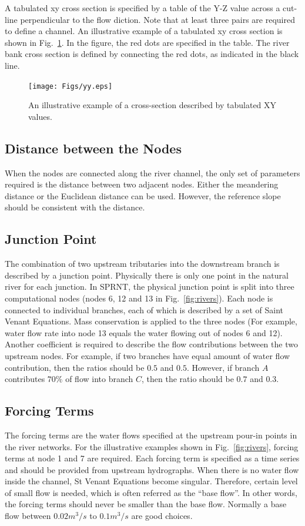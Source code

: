 \documentclass[10pt, letterpaper]{article}
\begin{document}
A tabulated xy cross section is specified by a table of the Y-Z value across a cut-line
perpendicular to the flow diction. Note that at least three pairs are required to define a
channel. An illustrative example of a tabulated xy cross section is shown in
Fig.~\ref{fig:yz}. In the figure, the red dots are specified in the table. The river bank
cross section is defined by connecting the red dots, as indicated in the black line.
\vspace{0.3in}
\begin{figure}[hb]
\centerline{
\texttt{[image: Figs/yy.eps]}}
\caption{An illustrative example of a cross-section described by tabulated XY values.}
\label{fig:yz}
\end{figure}

\subsection{Distance between the Nodes}
\label{subsec:distance}
When the nodes are connected along the river channel, the only set of parameters required
is the distance between two adjacent nodes. Either the meandering distance or the
Euclidean distance can be used. However, the reference slope should be consistent with the
distance.

\subsection{Junction Point}
\label{subsec:junction_pt}
The combination of two upstream tributaries into the downstream branch is described by a
junction point. Physically there is only one point in the natural river for each
junction. In SPRNT, the physical junction point is split into three computational nodes
(nodes 6, 12 and 13 in Fig.~\ref{fig:rivers}). Each node is connected to individual
branches, each of which is described by a set of Saint Venant Equations.  Mass
conservation is applied to the three nodes (For example, water flow rate into node 13
equals the water flowing out of nodes 6 and 12). Another coefficient is required to
describe the flow contributions between the two upstream nodes. For example, if two
branches have equal amount of water flow contribution, then the ratios should be $0.5$ and
$0.5$. However, if branch $A$ contributes $70\%$ of flow into branch $C$, then the ratio
should be $0.7$ and $0.3$. 

\subsection{Forcing Terms}
\label{subsec:forcing}
The forcing terms are the water flows specified at the upstream pour-in points in the river
networks. For the illustrative examples shown in Fig.~\ref{fig:rivers}, forcing terms at
node 1 and 7 are required. Each forcing term is specified as a time series
and should be provided from upstream hydrographs. When there is no water flow inside the
channel, St Venant Equations become singular. Therefore, certain level of small flow is
needed, which is often referred as the ``base flow''. In other words, the forcing terms
should never be smaller than the base flow. Normally a base flow between $0.02 m^3/s$ to
$0.1 m^3/s$ are good choices. 
\end{document}
